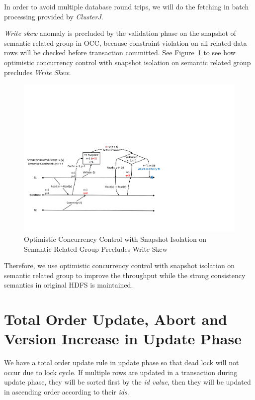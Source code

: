 \noindent In order to avoid multiple database round trips, we will do the fetching in batch processing provided by \textit{ClusterJ}.

\noindent \textit{Write skew} anomaly is precluded by the validation phase on the snapshot of semantic related group in OCC, because constraint violation on all related data rows will be checked before transaction committed. See Figure~\ref{fig:snapwriteskew} to see how optimistic concurrency control with snapshot isolation on semantic related group precludes \textit{Write Skew}.

\begin{figure}[h]
	\centering
	\includegraphics[width=\linewidth]{figs/snapwriteskew.pdf}
	\caption{Optimistic Concurrency Control with Snapshot Isolation on Semantic Related Group Precludes Write Skew}
	\label{fig:snapwriteskew}
\end{figure}

\noindent Therefore, we use optimistic concurrency control with snapshot isolation on semantic related group to improve the throughput while the strong consistency semantics in original HDFS is maintained.

\section{Total Order Update, Abort and Version Increase in Update Phase}
We have a total order update rule in update phase so that dead lock will not occur due to lock cycle. If multiple rows are updated in a transaction during update phase, they will be sorted first by the \textit{id value}, then they will be updated in ascending order according to their \textit{ids}. 

